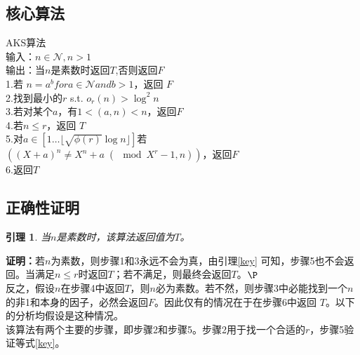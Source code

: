 \documentclass[a4paper]{article}
\newtheorem{lemma}{引理}[section]
\numberwithin{equation}{section}
\begin{document}
\begin{multicols}{2}
  \subsection{核心算法}\label{sec_r1}
  \begin{boxedminipage}{\columnwidth}
    AKS算法\\
    输入：$n\in\mathcal{N},n>1$\\
    输出：当$n$是素数时返回$T$,否则返回$F$\\
    1.\quad 若 $n=a^b for a\in\mathcal{N} and b>1$，返回 $F$\\
    2.\quad 找到最小的$r$ s.t. $o_r (n)>\log^2 n$\\
    3.\quad 若对某个$a$，有$1<(a,n)<n$，返回$F$\\
    4.\quad 若$n\le r$，返回 $T$\\
    5.\quad 对$a\in\left[1\ldots\lfloor\sqrt{\phi (r)}\log n\rfloor\right]$若\\
    \indent\quad$\left((X+a)^n\ne X^n+a\;(\!\!\!\!\!\mod X^r-1,n)\right)$，返回$F$\\
    6.\quad 返回$T$
  \end{boxedminipage}
  \subsection{正确性证明}
  \begin{lemma}\label{pp}
    \upshape 当$n$是素数时，该算法返回值为$T$。
  \end{lemma}
  \textbf{证明：}若$n$为素数，则步骤1和3永远不会为真，由引理\ref{key} 可知，步骤5也不会返回。当满足$n\le
  r$时返回$T$；若不满足，则最终会返回$T$。$\P$\\[.2cm]
  反之，假设$n$在步骤4中返回$T$，则$n$必为素数。若不然，则步骤3中必能找到一个$n$的非1和本身的因子，必然会返回$F$。因此仅有的情况在于在步骤6中返回
  $T$。以下的分析均假设是这种情况。\\
  该算法有两个主要的步骤，即步骤2和步骤5。步骤2用于找一个合适的$r$，步骤5验证等式\ref{key}。


\end{multicols}
\end{document}
